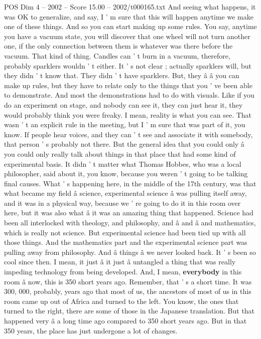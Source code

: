 \begin{textsample}{POS Dim 4 – 2002 – Score 15.00 – 2002/t000165.txt}
And seeing what happens, it was OK to generalize, and say, I ' m sure that this will happen anytime we make one of these things.
And so you can start making up some rules.
You say, anytime you have a vacuum state, you will discover that one wheel will not turn another one, if the only connection between them is whatever was there before the vacuum.
That kind of thing.
Candles can ' t burn in a vacuum, therefore, probably sparklers wouldn ' t either.
It ' s not clear ; actually sparklers will, but they didn ' t know that.
They didn ' t have sparklers.
But, they â â you can make up rules, but they have to relate only to the things that you ' ve been able to demonstrate.
And most the demonstrations had to do with visuals.
Like if you do an experiment on stage, and nobody can see it, they can just hear it, they would probably think you were freaky.
I mean, reality is what you can see.
That wasn ' t an explicit rule in the meeting, but I ' m sure that was part of it, you know.
If people hear voices, and they can ' t see and associate it with somebody, that person ' s probably not there.
But the general idea that you could only â you could only really talk about things in that place that had some kind of experimental basis.
It didn ' t matter what Thomas Hobbes, who was a local philosopher, said about it, you know, because you weren ' t going to be talking final causes.
What ' s happening here, in the middle of the 17th century, was that what became my field â science, experimental science â was pulling itself away, and it was in a physical way, because we ' re going to do it in this room over here, but it was also what â it was an amazing thing that happened.
Science had been all interlocked with theology, and philosophy, and â and â and mathematics, which is really not science.
But experimental science had been tied up with all those things.
And the mathematics part and the experimental science part was pulling away from philosophy.
And â things â we never looked back.
It ' s been so cool since then.
I mean, it just â it just â untangled a thing that was really impeding technology from being developed.
And, I mean, \textbf{everybody} in this room â now, this is 350 short years ago.
Remember, that ' s a short time.
It was 300, 000, probably, years ago that most of us, the ancestors of most of us in this room came up out of Africa and turned to the left.
You know, the ones that turned to the right, there are some of those in the Japanese translation.
But that happened very â a long time ago compared to 350 short years ago.
But in that 350 years, the place has just undergone a lot of changes.

\end{textsample}

